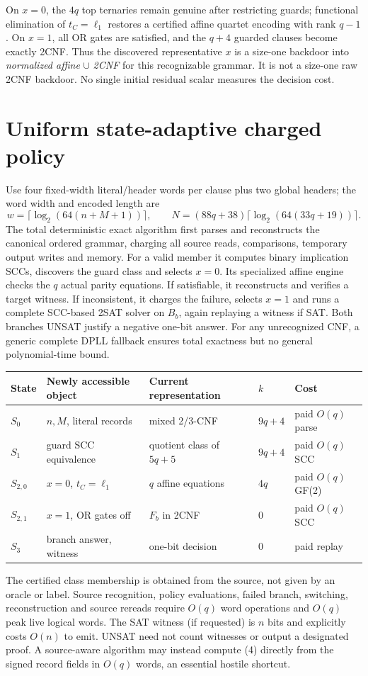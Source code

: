 \documentclass[11pt]{article}
\begin{document}
On $x=0$, the $4q$ top ternaries remain genuine after restricting
guards; functional elimination of $t_C=\ell_1$ restores a certified
affine quartet encoding with rank $q-1$.
On $x=1$, all OR gates are satisfied, and the $q+4$
guarded clauses become exactly 2CNF.
Thus the discovered representative $x$ is a size-one backdoor into
\emph{normalized affine} $\cup$ \emph{2CNF} for this
recognizable grammar. It is not a size-one raw 2CNF backdoor.
No single initial residual scalar measures the decision cost.

\section{Uniform state-adaptive charged policy}
Use four fixed-width literal/header words per clause plus two global
headers; the word width and encoded length are
\[
w=\lceil\log_2(64(n+M+1))\rceil,\qquad
N=(88q+38)\lceil\log_2(64(33q+19))\rceil. \tag{8}
\]
The total deterministic exact algorithm first parses and reconstructs
the canonical ordered grammar, charging all source reads, comparisons,
temporary output writes and memory. For a valid member it computes
binary implication SCCs, discovers the guard class and selects $x=0$.
Its specialized affine engine checks the $q$ actual parity equations.
If satisfiable, it reconstructs and verifies a target witness.
If inconsistent, it charges the failure, selects $x=1$ and runs
a complete SCC-based 2SAT solver on $B_b$, again replaying a witness
if SAT. Both branches UNSAT justify a negative one-bit answer.
For any unrecognized CNF, a generic complete DPLL fallback ensures
total exactness but no general polynomial-time bound.

\begin{center}\small
\begin{tabular}{@{}lllll@{}}\toprule
State & Newly accessible object & Current representation & $k$ & Cost \\\midrule
$S_0$ & $n,M$, literal records & mixed 2/3-CNF & $9q+4$ & paid $O(q)$ parse \\
$S_1$ & guard SCC equivalence & quotient class of $5q+5$ & $9q+4$ & paid $O(q)$ SCC \\
$S_{2,0}$ & $x=0$, $t_C=\ell_1$ & $q$ affine equations & $4q$ & paid $O(q)$ GF(2) \\
$S_{2,1}$ & $x=1$, OR gates off & $F_b$ in 2CNF & 0 & paid $O(q)$ SCC \\
$S_3$ & branch answer, witness & one-bit decision & 0 & paid replay \\\bottomrule
\end{tabular}
\end{center}
The certified class membership is obtained from the source, not
given by an oracle or label. Source recognition, policy evaluations,
failed branch, switching, reconstruction and source rereads require
$O(q)$ word operations and $O(q)$ peak live logical words. The SAT
witness (if requested) is $n$ bits and explicitly costs $O(n)$ to emit.
UNSAT need not count witnesses or output a designated proof.
A source-aware algorithm may instead compute (4) directly from the
signed record fields in $O(q)$ words, an essential hostile shortcut.
\end{document}
